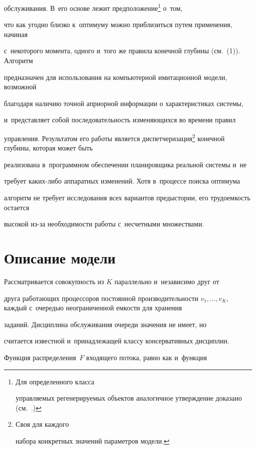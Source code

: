 обслуживания. В~его основе лежит предположение\footnote{ Для определенного класса 


управляемых регенерируемых объектов аналогичное утверждение доказано (см.~\cite{7-raz}.)} о~том, 


что как угодно близко к~оптимуму можно приблизиться путем применения, начиная 


с~некоторого момента, одного и~того же правила конечной глубины (см.~(1)). Алгоритм 


предназначен для использования на компьютерной имитационной модели, возможной 


благодаря наличию точной априорной информации о характеристиках системы, 


и~представляет собой последовательность изменяющихся во времени правил 


управления. Результатом его работы является диспетчеризация\footnote{Своя для каждого 


набора конкретных значений параметров модели.} конечной глубины, которая может быть 


реализована в~программном обеспечении планировщика реальной сис\-те\-мы и~не 


требует ка\-ких-ли\-бо аппаратных изменений. Хотя в~процессе поиска оптимума 


алгоритм не требует исследования всех вариантов предыстории, его трудоемкость остается 


высокой из-за необходимости работы с~несчетными множествами. 





\section{Описание модели }





  Рассматривается совокупность из $K$ параллельно и~независимо друг от 


друга работающих процессоров постоянной производительности $v_1, 


\ldots , v_K$, каждый с~очередью неограниченной емкости для хранения 


заданий. Дисциплина обслуживания очереди значения не имеет, но 


считается известной и~принадлежащей классу консервативных дисциплин. 


Функция распределения~$F$ входящего потока, равно как и~функция 


